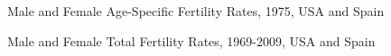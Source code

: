 
\begin{figure}[ht!]
        \centering  
          \caption{Male and Female Age-Specific Fertility Rates, 1975, USA and
          Spain}
          \label{fig:ASFR1975}
\end{figure}

\begin{figure}[ht!]
        \centering  
          \caption{Male and Female Total Fertility Rates, 1969-2009, USA and
          Spain}
          \label{fig:TFRseries}
\end{figure}

